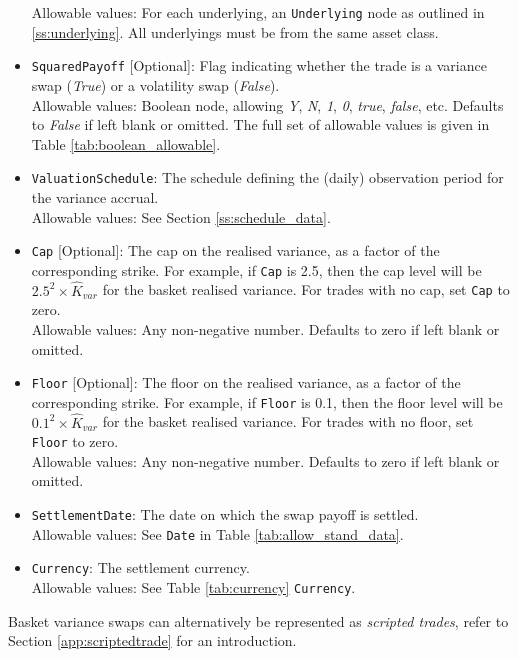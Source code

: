 \begin{itemize}
    Allowable values: For each underlying, an \lstinline!Underlying! node as outlined in
    \ref{ss:underlying}. All underlyings must be from the same asset class.
  \item{} \lstinline!SquaredPayoff! [Optional]: Flag indicating whether the trade is a variance swap (\emph{True})
  or a volatility swap (\emph{False}). \\
  Allowable values: Boolean node, allowing \emph{Y}, \emph{N}, \emph{1}, \emph{0}, \emph{true}, \emph{false}, etc.
  Defaults to \emph{False} if left blank or omitted. The full set of allowable values is given in Table \ref{tab:boolean_allowable}.
\item{} \lstinline!ValuationSchedule!: The schedule defining the (daily) observation period for the variance accrual. \\
    Allowable values: See Section \ref{ss:schedule_data}.
  \item{} \lstinline!Cap! [Optional]: The cap on the realised variance, as a factor of the corresponding strike. For example,
  if \lstinline!Cap! is 2.5, then the cap level will be $2.5^2 \times \hat{K}_{var}$ for the basket realised variance.
  For trades with no cap, set \lstinline!Cap! to zero. \\
    Allowable values: Any non-negative number. Defaults to zero if left blank or omitted.
  \item{} \lstinline!Floor! [Optional]:  The floor on the realised variance, as a factor of the corresponding strike. For example,
  if \lstinline!Floor! is 0.1, then the floor level will be $0.1^2 \times \hat{K}_{var}$ for the basket realised variance.
  For trades with no floor, set \lstinline!Floor! to zero. \\
    Allowable values: Any non-negative number. Defaults to zero if left blank or omitted.
  \item{} \lstinline!SettlementDate!: The date on which the swap payoff is settled. \\
    Allowable values: See \lstinline!Date! in Table \ref{tab:allow_stand_data}.
  \item{} \lstinline!Currency!: The settlement currency. \\
    Allowable values: See Table \ref{tab:currency} \lstinline!Currency!.
\end{itemize}

Basket variance swaps can alternatively be represented as {\em scripted trades}, refer to Section \ref{app:scriptedtrade} for an introduction.

